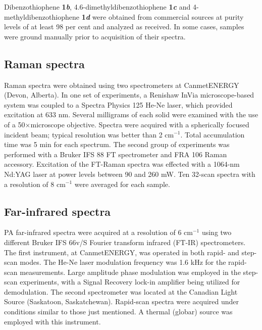	Dibenzothiophene \textbf{1\textit{b}}, 4.6-dimethyldibenzothiophene \textbf{1\textit{c}} and 4-methyldibenzothiophene \textbf{1\textit{d}} were obtained from commercial sources at purity levels of at least 98 per cent and analyzed as received. In some cases, samples were ground manually prior to acquisition of their spectra. 
	
	\bigskip
	
	\subsection{Raman spectra}	

	Raman spectra were obtained using two spectrometers at CanmetENERGY (Devon, Alberta). In one set of experiments, a Renishaw InVia microscope-based system was coupled to a Spectra Physics 125 He-Ne laser, which provided excitation at 633 nm. Several milligrams of each solid were examined with the use of a 50$\times$microscope objective. Spectra were acquired with a spherically focused incident beam; typical resolution was better than 2 cm$^{-1}$. Total accumulation time was 5 min for each spectrum. The second group of experiments was performed with a Bruker IFS 88 FT spectrometer and FRA 106 Raman accessory. Excitation of the FT-Raman spectra was effected with a 1064-nm Nd:YAG laser at power levels between 90 and 260 mW. Ten 32-scan spectra with a resolution of 8 cm$^{-1}$ were averaged for each sample. \\
	
	\subsection{Far-infrared spectra}
	
	\bigskip
	
	PA far-infrared spectra were acquired at a resolution of 6 cm$^{-1}$ using two different Bruker IFS 66v/S Fourier transform infrared (FT-IR) spectrometers. The first instrument, at CanmetENERGY, was operated in both rapid- and step-scan modes. The He-Ne laser modulation frequency was 1.6 kHz for the rapid-scan measurements. Large amplitude phase modulation\cite{michaelian2009far} was employed in the step-scan experiments, with a Signal Recovery lock-in amplifier being utilized for demodulation. The second spectrometer was located at the Canadian Light Source (Saskatoon, Saskatchewan). Rapid-scan spectra were acquired under conditions similar to those just mentioned. A thermal (globar) source was employed with this instrument.\\
	
